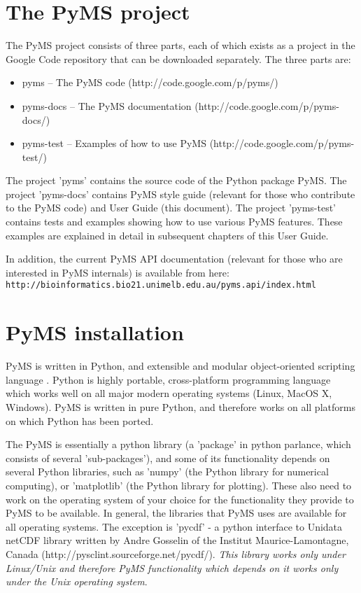 \section{The PyMS project}

The PyMS project consists of three parts, each of which exists as a project
in the Google Code repository that can be downloaded separately. The three
parts are:

\begin{itemize}
  \item pyms -- The PyMS code (http://code.google.com/p/pyms/)
  \item pyms-docs -- The PyMS documentation (http://code.google.com/p/pyms-docs/)
  \item pyms-test -- Examples of how to use PyMS (http://code.google.com/p/pyms-test/)
\end{itemize}

The project 'pyms' contains the source code of the Python package PyMS.
The project 'pyms-docs' contains PyMS style guide (relevant for those
who contribute to the PyMS code) and User Guide (this document). The
project 'pyms-test' contains tests and examples showing how to use
various PyMS features. These examples are explained in detail in 
subsequent chapters of this User Guide.

In addition, the current PyMS API documentation (relevant for those
who are interested in PyMS internals) is available from here:\\
{\tt http://bioinformatics.bio21.unimelb.edu.au/pyms.api/index.html}\\

\section{PyMS installation}

PyMS is written in Python, and extensible and modular object-oriented
scripting language \cite{python}. Python is highly portable, cross-platform 
programming language which works well on all major modern operating
systems (Linux, MacOS X, Windows). PyMS is written in pure Python, and
therefore works on all platforms on which Python has been ported.

The PyMS is essentially a python library (a 'package' in python parlance,
which consists of several 'sub-packages'), and some of its functionality
depends on several Python libraries, such as 'numpy' (the Python library
for numerical computing), or 'matplotlib' (the Python library for plotting).
These also need to work on the operating system of your choice for the
functionality they provide to PyMS to be available. In general, the
libraries that PyMS uses are available for all operating systems. The
exception is 'pycdf' - a python interface to Unidata netCDF library
written by Andre Gosselin of the Institut Maurice-Lamontagne, Canada
(http://pysclint.sourceforge.net/pycdf/). {\em This library works only
under Linux/Unix and therefore PyMS functionality which depends on
it works only under the Unix operating system}.

